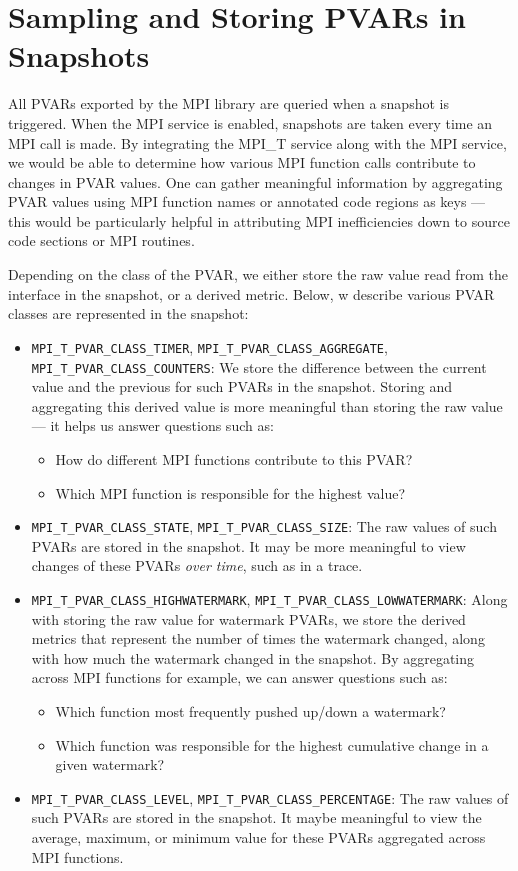 \section{Sampling and Storing PVARs in Snapshots}
All PVARs exported by the MPI library are queried when a snapshot is triggered. When the MPI service is enabled, snapshots are taken every time an MPI call is made. By integrating the MPI\_T service along with the MPI service, we would be able to determine how various MPI function calls contribute to changes in PVAR values. One can gather meaningful information by aggregating PVAR values using MPI function names or annotated code regions as keys --- this would be particularly helpful in attributing MPI inefficiencies down to source code sections or MPI routines. 
\par Depending on the class of the PVAR, we either store the raw value read from the interface in the snapshot, or a derived metric. Below, w describe various PVAR classes are represented in the snapshot:
\begin{itemize}
	\item \verb+MPI_T_PVAR_CLASS_TIMER+, \verb+MPI_T_PVAR_CLASS_AGGREGATE+, \verb+MPI_T_PVAR_CLASS_COUNTERS+: We store the difference between the current value and the previous for such PVARs in the snapshot. Storing and aggregating this derived value is more meaningful than storing the raw value --- it helps us answer questions such as: 
 \begin{itemize}
   \item How do different MPI functions contribute to this PVAR? 
   \item Which MPI function is responsible for the highest value?
 \end{itemize}
	\item \verb+MPI_T_PVAR_CLASS_STATE+, \verb+MPI_T_PVAR_CLASS_SIZE+: The raw values of such PVARs are stored in the snapshot. It may be more meaningful to view changes of these PVARs \emph{over time}, such as in a trace.
	\item \verb+MPI_T_PVAR_CLASS_HIGHWATERMARK+, \verb+MPI_T_PVAR_CLASS_LOWWATERMARK+: Along with storing the raw value for watermark PVARs, we store the derived metrics that represent the number of times the watermark changed, along with how much the watermark changed in the snapshot. By aggregating across MPI functions for example, we can answer questions such as: 
 \begin{itemize}
   \item Which function most frequently pushed up/down a watermark? 
   \item Which function was responsible for the highest cumulative change in a given watermark?
 \end{itemize}
 \item \verb+MPI_T_PVAR_CLASS_LEVEL+, \verb+MPI_T_PVAR_CLASS_PERCENTAGE+: The raw values of such PVARs are stored in the snapshot. It maybe meaningful to view the average, maximum, or minimum value for these PVARs aggregated across MPI functions.
\end{itemize}

